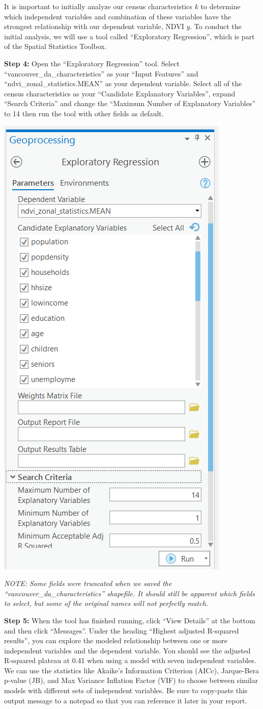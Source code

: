 \documentclass[
]{book}
\begin{document}
It is important to initially analyze our census characteristics \(k\) to determine which independent variables and combination of these variables have the strongest relationship with our dependent variable, NDVI \(y\). To conduct the initial analysis, we will use a tool called ``Exploratory Regression'', which is part of the Spatial Statistics Toolbox.

\textbf{Step 4:} Open the ``Exploratory Regression'' tool. Select ``vancouver\_da\_characteristics'' as your ``Input Features'' and ``ndvi\_zonal\_statistics.MEAN'' as your dependent variable. Select all of the census characteristics as your ``Candidate Explanatory Variables'', expand ``Search Criteria'' and change the ``Maximum Number of Explanatory Variables'' to 14 then run the tool with other fields as default.

\includegraphics[width=0.5\linewidth]{images/06-arcgis-exploratory-regression}

\emph{NOTE: Some fields were truncated when we saved the ``vancouver\_da\_characteristics'' shapefile. It should still be apparent which fields to select, but some of the original names will not perfectly match.}

\textbf{Step 5:} When the tool has finished running, click ``View Details'' at the bottom and then click ``Messages''. Under the heading ``Highest adjusted R-squared results'', you can explore the modeled relationship between one or more independent variables and the dependent variable. You should see the adjusted R-squared plateau at 0.41 when using a model with seven independent variables. We can use the statistics like Akaike's Information Criterion (AICc), Jarque-Bera p-value (JB), and Max Variance Inflation Factor (VIF) to choose between similar models with different sets of independent variables. Be sure to copy-paste this output message to a notepad so that you can reference it later in your report.
\end{document}
